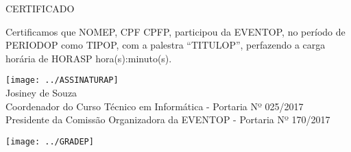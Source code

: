 \documentclass{abnt}
\begin{document}
\BgThispage
\color{CONF_COR}
\bf
\begin{center}
    \Huge{CERTIFICADO}
\end{center}

Certificamos que NOMEP, CPF CPFP, participou da EVENTOP, no período de
PERIODOP como TIPOP, com a palestra ``TITULOP'', perfazendo a carga horária
de HORASP hora(s):minuto(s).


\begin{center}
\texttt{[image: ../ASSINATURAP]}\\
Josiney de Souza\\
Coordenador do Curso Técnico em Informática - Portaria Nº 025/2017\\
Presidente da Comissão Organizadora da EVENTOP - Portaria Nº 170/2017
\end{center}

\newpage
{}

\texttt{[image: ../GRADEP]}
\end{document}
